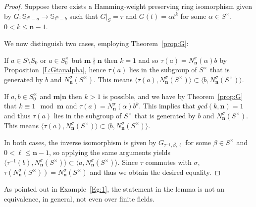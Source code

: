 \documentclass[11pt]{amsart}
\theoremstyle{plain}
\theoremstyle{definition}
\numberwithin{equation}{section}
\numberwithin{figure}{section}
\newcommand{\Sone}[1]{\Stsigma/\Stsigma (t^{\de}-#1)} %
\newcommand{\ring}{S}
\newcommand{\Stsigma}{S[t;\sigma]}
\newcommand{\os}{\mathbf{m}}  %
\newcommand{\de}{\mathbf{n}}  %
\begin{document}
\begin{proof}
  Suppose there  exists a Hamming-weight preserving ring isomorphism
    given by  $G:\mathbb{S}_{t^\de-a} \to \mathbb{S}_{t^\de-b}
    $
    such that $G|_S=\tau$ and $G(t)=\alpha t^k$ for some $\alpha\in S^\times$, $0<k\leq \de-1$.

 We now distinguish two cases, employing Theorem~\ref{prop:G}:

 If $a\in S\setminus S_0$ or $a\in S_0^\times$ but $\os\nmid\de$ then $k=1$ and so $\tau(a)=N_{\de}^\sigma(\alpha) b$
by Proposition~\ref{L:Gtaualpha},
hence $\tau(a)$ lies in the subgroup of $S^\times$ that is generated by $b$ and $N_{\de}^\sigma( S^\times) $. This means $\langle \tau(a), N_{\de}^\sigma( S^\times) \rangle \subset \langle b, N_{\de}^\sigma( S^\times ) \rangle$.


If $a,b\in S_0^\times$ and $\os|\de$ then $k>1$ is possible, and we have by Theorem~\ref{prop:G} that
 $k\equiv 1 \mod \os$ and $\tau(a)=N_{\de}^\sigma(\alpha)b^k$.
This implies that $gcd(k,\de)=1$ and thus
 $\tau(a)$ lies in the subgroup of $S^\times$ that is generated by $b$ and $N_{\de}^\sigma( S^\times)$. This means $\langle \tau(a), N_{\de}^\sigma( S^\times) \rangle \subset \langle b, N_{\de}^\sigma( S^\times ) \rangle$.

In both cases, the inverse isomorphism is given by $G_{\tau^{-1},\beta,\ell}$ for some $\beta\in \ring^\times$ and $0<\ell\leq \de-1$, so applying the same arguments yields $\langle \tau^{-1}(b),N_{\de}^\sigma(\ring^\times)\rangle \subset \langle a, N_{\de}^\sigma(\ring^\times)\rangle.$  Since $\tau$ commutes with $\sigma$, $\tau(N_{\de}^\sigma(\ring^\times))=N_{\de}^\sigma(\ring^\times)$ and thus we obtain the desired equality.
\end{proof}

As pointed out in Example~\ref{Eg:1}, the statement in the lemma is not an equivalence, in general, not even over finite fields.
\end{document}
